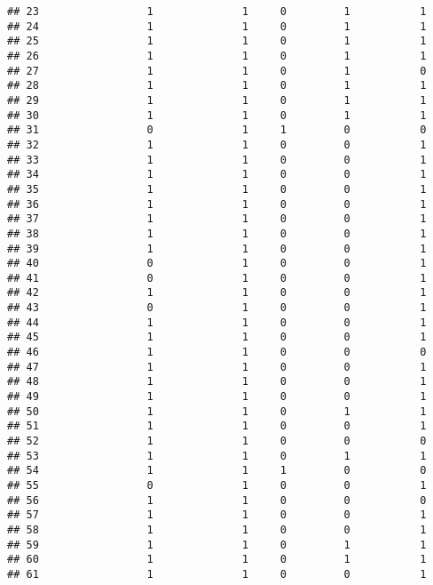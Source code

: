 \documentclass[]{article}
\begin{document}
\begin{verbatim}
## 23                 1              1     0         1           1
## 24                 1              1     0         1           1
## 25                 1              1     0         1           1
## 26                 1              1     0         1           1
## 27                 1              1     0         1           0
## 28                 1              1     0         1           1
## 29                 1              1     0         1           1
## 30                 1              1     0         1           1
## 31                 0              1     1         0           0
## 32                 1              1     0         0           1
## 33                 1              1     0         0           1
## 34                 1              1     0         0           1
## 35                 1              1     0         0           1
## 36                 1              1     0         0           1
## 37                 1              1     0         0           1
## 38                 1              1     0         0           1
## 39                 1              1     0         0           1
## 40                 0              1     0         0           1
## 41                 0              1     0         0           1
## 42                 1              1     0         0           1
## 43                 0              1     0         0           1
## 44                 1              1     0         0           1
## 45                 1              1     0         0           1
## 46                 1              1     0         0           0
## 47                 1              1     0         0           1
## 48                 1              1     0         0           1
## 49                 1              1     0         0           1
## 50                 1              1     0         1           1
## 51                 1              1     0         0           1
## 52                 1              1     0         0           0
## 53                 1              1     0         1           1
## 54                 1              1     1         0           0
## 55                 0              1     0         0           1
## 56                 1              1     0         0           0
## 57                 1              1     0         0           1
## 58                 1              1     0         0           1
## 59                 1              1     0         1           1
## 60                 1              1     0         1           1
## 61                 1              1     0         0           1

\end{verbatim}
\end{document}
